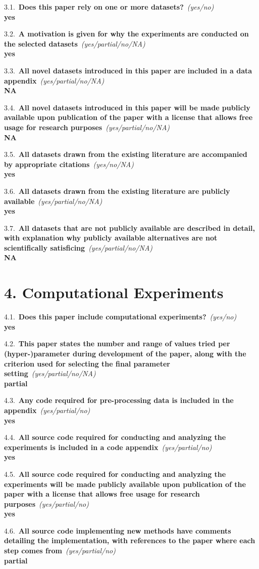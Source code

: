 \documentclass[letterpaper]{article}
\newcommand{\question}[2]{\vspace{6pt}\noindent\textbf{#1}~\textit{#2}\\}
\newcommand{\answer}[1]{\textbf{#1}}
\begin{document}
3.1.~\question{Does this paper rely on one or more datasets?}{(yes/no)}
\answer{yes}

3.2.~\question{A motivation is given for why the experiments are conducted on the
selected datasets}{(yes/partial/no/NA)}
\answer{yes}

3.3.~\question{All novel datasets introduced in this paper are included in a data
appendix}{(yes/partial/no/NA)}
\answer{NA}

3.4.~\question{All novel datasets introduced in this paper will be made publicly
available upon publication of the paper with a license that allows free usage for
research purposes}{(yes/partial/no/NA)}
\answer{NA}

3.5.~\question{All datasets drawn from the existing literature are accompanied by
appropriate citations}{(yes/no/NA)}
\answer{yes}

3.6.~\question{All datasets drawn from the existing literature are publicly
available}{(yes/partial/no/NA)}
\answer{yes}

3.7.~\question{All datasets that are not publicly available are described in
detail, with explanation why publicly available alternatives are not
scientifically satisficing}{(yes/partial/no/NA)}
\answer{NA}

\section*{4. Computational Experiments}

4.1.~\question{Does this paper include computational experiments?}{(yes/no)}
\answer{yes}

4.2.~\question{This paper states the number and range of values tried per
(hyper-)parameter during development of the paper, along with the criterion used
for selecting the final parameter setting}{(yes/partial/no/NA)}
\answer{partial}

4.3.~\question{Any code required for pre-processing data is included in the
appendix}{(yes/partial/no)}
\answer{yes}

4.4.~\question{All source code required for conducting and analyzing the
experiments is included in a code appendix}{(yes/partial/no)}
\answer{yes}

4.5.~\question{All source code required for conducting and analyzing the
experiments will be made publicly available upon publication of the paper with a
license that allows free usage for research purposes}{(yes/partial/no)}
\answer{yes}

4.6.~\question{All source code implementing new methods have comments detailing
the implementation, with references to the paper where each step comes
from}{(yes/partial/no)}
\answer{partial}
\end{document}
